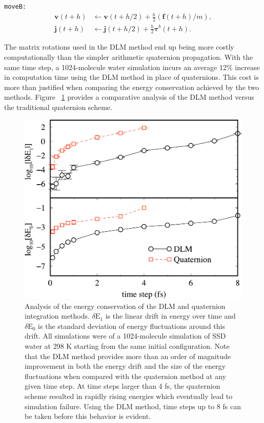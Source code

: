 \documentclass[letterpaper]{report}
\begin{document}
{\tt moveB:}
\begin{align*}
\mathbf{v}\left(t + h \right)  &\leftarrow  \mathbf{v}\left(t + h / 2 \right) 
	+ \frac{h}{2} \left( \mathbf{f}(t + h) / m \right), \\
%
\mathbf{j}\left(t + h \right)  &\leftarrow \mathbf{j}\left(t + h / 2 \right) 
	+ \frac{h}{2} \mathbf{\tau}^b(t + h) .
\end{align*}

The matrix rotations used in the DLM method end up being more
costly computationally than the simpler arithmetic quaternion
propagation. With the same time step, a 1024-molecule water simulation
incurs an average 12\% increase in computation time using the DLM method in place of quaternions. This cost is more than justified
when comparing the energy conservation achieved by the two
methods. Figure ~\ref{quatdlm} provides a comparative analysis of the
DLM method versus the traditional quaternion scheme.

\begin{figure}
\centering
\includegraphics[width=\linewidth]{quatvsdlm.pdf}
\caption[Energy conservation analysis of the DLM and quaternion 
integration methods]{Analysis of the energy conservation of the DLM 
and quaternion integration methods.  $\delta \mathrm{E}_1$ is the
linear drift in energy over time and $\delta \mathrm{E}_0$ is the
standard deviation of energy fluctuations around this drift.  All
simulations were of a 1024-molecule simulation of SSD water at 298 K
starting from the same initial configuration. Note that the DLM
method provides more than an order of magnitude improvement in both
the energy drift and the size of the energy fluctuations when compared
with the quaternion method at any given time step.  At time steps
larger than 4 fs, the quaternion scheme resulted in rapidly rising
energies which eventually lead to simulation failure.  Using the DLM
method, time steps up to 8 fs can be taken before this behavior
is evident.}
\label{quatdlm}
\end{figure}
\end{document}
